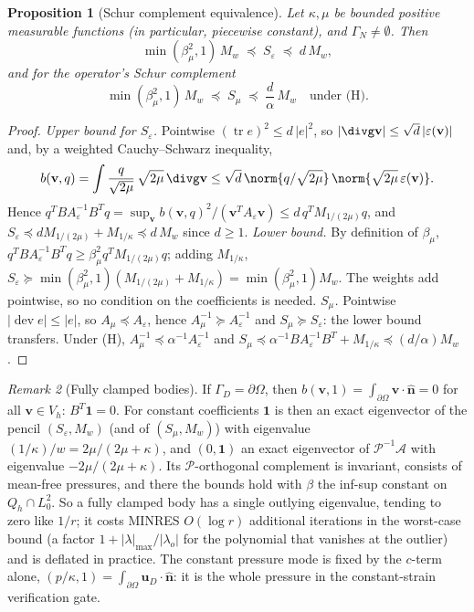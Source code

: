\documentclass[11pt]{article}
\numberwithin{equation}{section}
\newtheorem{proposition}{Proposition}[section]
\theoremstyle{remark}
\newtheorem{remark}[proposition]{Remark}
\newcommand{\eps}{\varepsilon}
\newcommand{\tr}{\operatorname{tr}}
\newcommand{\dev}{\operatorname{dev}}
\newcommand{\vu}{\mathbf{u}}
\newcommand{\vv}{\mathbf{v}}
\newcommand{\vn}{\hat{\mathbf{n}}}
\newcommand{\one}{\mathbf{1}}
\newcommand{\Ae}{A_{\eps}}
\newcommand{\Amu}{A_{\mu}}
\newcommand{\Mk}{M_{1/\kappa}}
\newcommand{\Mw}{M_{w}}
\newcommand{\Vh}{V_h}
\newcommand{\Qh}{Q_h}
\begin{document}
\begin{proposition}[Schur complement equivalence]
\label{prop:schur}
Let $\kappa,\mu$ be bounded positive measurable functions (in particular,
piecewise constant), and $\Gamma_N\ne\emptyset$. Then
\begin{equation}
  \min(\beta_\mu^2,1)\,\Mw\;\preceq\;S_\eps\;\preceq\;d\,\Mw ,
  \label{eq:schur-eps}
\end{equation}
and for the operator's Schur complement
\begin{equation}
  \min(\beta_\mu^2,1)\,\Mw\;\preceq\;S_\mu\;\preceq\;\frac{d}{\alpha}\,\Mw
  \quad\text{under (H)}.
  \label{eq:schur-mu}
\end{equation}
\end{proposition}
\begin{proof}
\emph{Upper bound for $S_\eps$.} Pointwise $(\tr e)^2\le d\,|e|^2$, so
$|\divg\vv|\le\sqrt d\,|\eps(\vv)|$ and, by a weighted Cauchy--Schwarz
inequality,
\[
  b(\vv,q) = \int\frac{q}{\sqrt{2\mu}}\,\sqrt{2\mu}\,\divg\vv
  \le\sqrt d\,\norm{q/\sqrt{2\mu}}\,\norm{\sqrt{2\mu}\,\eps(\vv)} .
\]
Hence $q^TB\Ae^{-1}B^Tq = \sup_{\vv}b(\vv,q)^2/(\vv^T\Ae\vv)\le d\,q^TM_{1/(2\mu)}q$,
and $S_\eps\preceq dM_{1/(2\mu)} + \Mk\preceq d\,\Mw$ since $d\ge1$.
\emph{Lower bound.} By definition of $\beta_\mu$, $q^TB\Ae^{-1}B^Tq\ge
\beta_\mu^2q^TM_{1/(2\mu)}q$; adding $\Mk$, $S_\eps\succeq\min(\beta_\mu^2,1)
(M_{1/(2\mu)} + \Mk) = \min(\beta_\mu^2,1)\Mw$. The weights add pointwise,
so no condition on the coefficients is needed.
\emph{$S_\mu$.} Pointwise $|\dev e|\le|e|$, so $\Amu\preceq\Ae$, hence
$\Amu^{-1}\succeq\Ae^{-1}$ and $S_\mu\succeq S_\eps$: the lower bound
transfers. Under (H), $\Amu^{-1}\preceq\alpha^{-1}\Ae^{-1}$ and
$S_\mu\preceq\alpha^{-1}B\Ae^{-1}B^T + \Mk\preceq(d/\alpha)\Mw$.
\end{proof}

\begin{remark}[Fully clamped bodies]
\label{rem:clamped}
If $\Gamma_D = \partial\Omega$, then $b(\vv,1) = \int_{\partial\Omega}
\vv\cdot\vn = 0$ for all $\vv\in\Vh$: $B^T\one = 0$. For constant
coefficients $\one$ is then an exact eigenvector of the pencil
$(S_\eps,\Mw)$ (and of $(S_\mu,\Mw)$) with eigenvalue
$(1/\kappa)/w = 2\mu/(2\mu + \kappa)$, and $(0,\one)$ an exact eigenvector
of $\mathcal P^{-1}\mathcal A$ with eigenvalue $-2\mu/(2\mu+\kappa)$. Its
$\mathcal P$-orthogonal complement is invariant, consists of mean-free
pressures, and there the bounds hold with $\beta$ the inf-sup constant on
$\Qh\cap L^2_0$. So a fully clamped body has a single outlying eigenvalue,
tending to zero like $1/r$; it costs MINRES $O(\log r)$ additional
iterations in the worst-case bound (a factor $1 + |\lambda|_{\max}/|\lambda_o|$
for the polynomial that vanishes at the outlier) and is deflated in
practice. The constant pressure mode is fixed by the $c$-term alone,
$(p/\kappa,1) = \int_{\partial\Omega}\vu_D\cdot\vn$: it is the whole
pressure in the constant-strain verification gate.
\end{remark}
\end{document}
